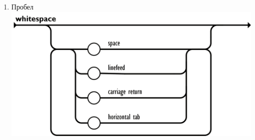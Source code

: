 \documentclass[a4page]{article}
\begin{document}
\begin{enumerate}
	\item Пробел \\
	      \includegraphics[scale=0.6]{whitespace.png}
\end{enumerate}

\newpage
{}
\printbibliography
\end{document}
